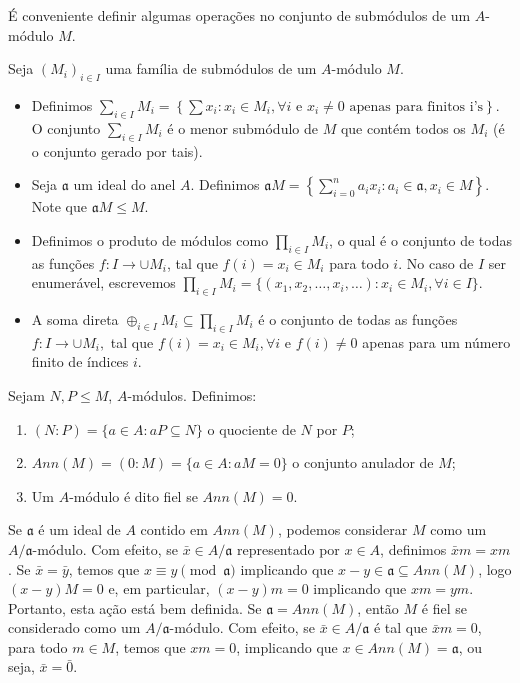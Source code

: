 É conveniente definir algumas operações no conjunto de submódulos de um $A$-módulo $M$.
\begin{definition}
	\label{loc:def_5_:_operações_em_submódulos.operações}
	Seja $(M_{i})_{i \in I}$ uma família de submódulos de um $A$-módulo $M$.

	\begin{itemize}
		\item Definimos $\sum_{i \in I} M_{i} = \left\{  \sum x_{i}: x_{i} \in M_{i}, \forall i \text{ e } x_{i}\not= 0 \text{ apenas para finitos i's}  \right\}$. O conjunto $\sum_{i \in I} M_{i}$ é o menor submódulo de $M$ que contém todos os $M_{i}$ (é o conjunto gerado por tais).
		\item Seja $\mathfrak{a}$ um ideal do anel $A$. Definimos $\mathfrak{a}M =  \left\{  \sum_{i=0}^n a_{i}x_{i}:a_{i} \in \mathfrak{a}, x_{i}\in M  \right\}$. Note que $\mathfrak{a}M \leq M$.
		\item Definimos o produto de módulos como $\prod_{i \in I} M_{i}$, o qual é o conjunto de todas as funções $f:I \to\cup M_{i}$, tal que $f(i) = x_{i} \in M_{i}$ para todo $i$. No caso de $I$ ser enumerável, escrevemos $\prod_{i \in I} M_{i} = \{(x_1, x_2, \ldots, x_i, \ldots) : x_i \in M_i, \forall i \in I\}$.
		\item A soma direta $\oplus_{i \in I}M_{i} \subseteq \prod_{i \in I} M_{i}$  é o conjunto de todas as funções $f:I \to \cup M_{i},$ tal que $f(i)= x_{i} \in M_{i}, \forall i$ e $f(i) \neq 0$ apenas para um número finito de índices $i$.
	\end{itemize}
\end{definition}
\begin{definition}
	\label{loc:def_5_:_operações_em_submódulos.módulos_(n_p)}
	Sejam $N, P \leq M$, $A$-módulos.
	Definimos:
	\begin{enumerate}
		\item $(N:P) = \{ a \in A : aP \subseteq N \}$ o quociente de $N$ por $P$;
		\item $Ann(M) = (0:M) = \{ a \in A: aM = 0 \}$ o conjunto anulador de $M$;
		\item Um $A$-módulo é dito fiel se $Ann(M) = 0$.
	\end{enumerate}
\end{definition}
\begin{observation}
	\label{loc:def_5_:_operações_em_submódulos.a/a:módulos}
	Se $\mathfrak{a}$ é um ideal de $A$ contido em $Ann(M)$, podemos considerar $M$ como um $A/\mathfrak{a}$-módulo.
	Com efeito, se $\bar{x} \in A/\mathfrak{a}$ representado por $x \in A$, definimos $\bar{x}m=xm$. Se $\bar{x}=\bar{y}$, temos que $x\equiv y \pmod{\mathfrak{a}}$ implicando que $x-y \in \mathfrak{a} \subseteq Ann(M)$, logo $(x-y)M = 0$ e, em particular, $(x-y)m =0$ implicando que $xm = ym$. Portanto, esta ação está bem definida.
	Se $\mathfrak{a} = Ann(M)$, então $M$ é fiel se considerado como um $A/\mathfrak{a}$-módulo.
	Com efeito, se $\bar{x} \in A/\mathfrak{a}$ é tal que $\bar{x}m=0$, para todo $m \in M$, temos que $xm = 0$, implicando que $x \in Ann(M)= \mathfrak{a}$, ou seja, $\bar{x}=\bar{0}$.
\end{observation}
